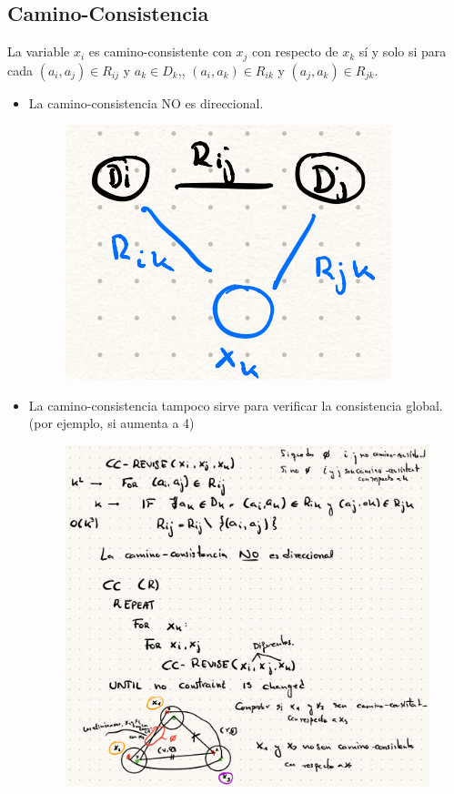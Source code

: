 \documentclass[12pt, twoside, openright]{report} %
\begin{document}
	
\subsection{Camino-Consistencia}


    La variable \(x_i\) es camino-consistente con \(x_j\) con respecto
    de \(x_k\) sí y solo si para cada \((a_i,a_j) \in R_{ij}\) y
    \(a_k \in D_k\),, \((a_i,a_k) \in R_{ik}\) y
    \((a_j,a_k) \in R_{jk}\).

    \begin{itemize}
    \item
      La camino-consistencia NO es direccional.
	  \begin{figure}[H]
		{\includegraphics[scale=.42]{Untitled 40.png}}
	\end{figure}
	\pagebreak
    \item
      La camino-consistencia tampoco sirve para verificar la
      consistencia global. (por ejemplo, si aumenta a 4)
	  \begin{figure}[H]
		{\includegraphics[scale=.15]{Untitled 41.png}}
	\end{figure}
    \end{itemize}
\end{document}
